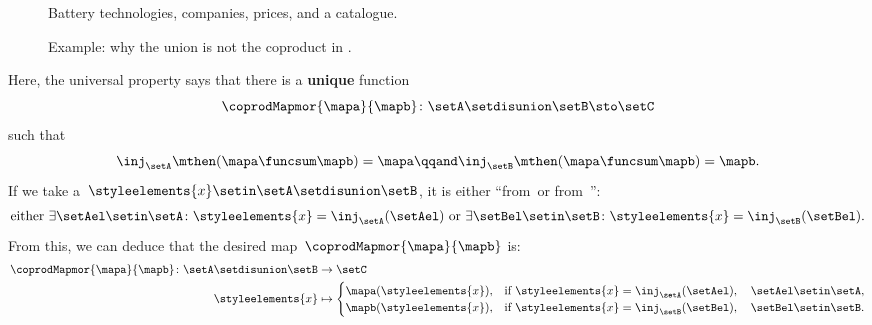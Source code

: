 \begin{example}
    \begin{figure}[tbh]
        \centering
        \caption{Battery technologies, companies, prices, and a catalogue.}
        \label{fig:coprod_batteries_1}
    \end{figure}

    \begin{figure}[tbh]
        \centering
        \caption{Example: why the union is not the coproduct in \Set.}
        \label{fig:coprod_batteries_2}
    \end{figure}

    Here, the universal property says that there is a \textbf{unique} function
    \begin{equation}
        \coprodMapmor{\mapa}{\mapb}\colon \setA \setdisunion \setB \sto \setC
    \end{equation} such that
    \begin{equation}
        \label{eq:exa-batt-factoring-maps}
        \inj_\setA\mthen (\mapa \funcsum \mapb)=\mapa
        \qqand
        \inj_\setB\mthen (\mapa \funcsum \mapb)=\mapb.
    \end{equation}
    If we take a~$\styleelements{x}\setin \setA \setdisunion \setB$, it is either ``from~\setA or from~\setB'':
    \begin{equation}
        \label{eq:exa-batt-explain-sum-map}
        \text{either } \exists \setAel\setin \setA\colon \styleelements{x}=\inj_\setA(\setAel) \text{ or }\exists \setBel\setin \setB\colon \styleelements{x}=\inj_\setB(\setBel).
    \end{equation}
    From this, we can deduce that the desired map~$\coprodMapmor{\mapa}{\mapb}$ is:
    \begin{equation}
        \label{eq:exa-batt-def-sum-map}
        \begin{aligned}
            \coprodMapmor{\mapa}{\mapb} \colon \setA \setdisunion \setB & \to \setC \\
            \styleelements{x}                                           & \mapsto
            \begin{cases}
                \mapa(\styleelements{x}), & \text{if } \styleelements{x}=\inj_\setA(\setAel),\quad \setAel \setin \setA, \\
                \mapb(\styleelements{x}), & \text{if } \styleelements{x}=\inj_\setB(\setBel),\quad \setBel \setin \setB.

\end{cases}
\end{aligned}
\end{equation}
\end{example}
